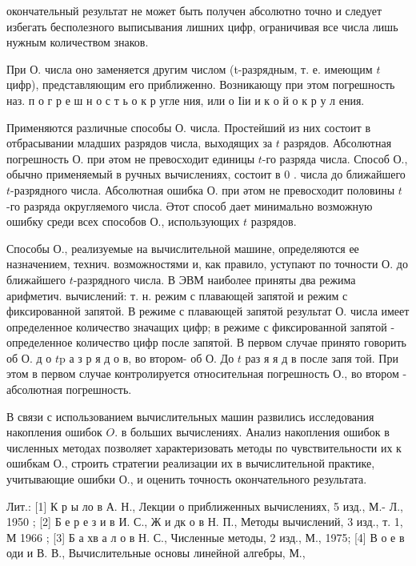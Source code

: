 \documentclass[10pt]{article}
\begin{document}
окончательный результат не может быть получен абсолютно точно и следует избегать бесполезного выписывания лишних цифр, ограничивая все числа лишь нужным количеством знаков.



При О. числа оно заменяется другим числом (t-разрядным, т. е. имеющим $t$ цифр), представляющим его приближенно. Возникающу при этом погрешность наз. п о г р е ш н о с т ь о к р угле ния, или о Ііи и к о й о к р у л ения.



Применяются различные способы О. числа. Простейший из них состоит в отбрасывании младших разрядов числа, выходящих за $t$ разрядов. Абсолютная погрешность О. при әтом не превосходит единицы $t$-го разряда числа. Способ О., обычно применяемый в ручных вычислениях, состоит в 0 . числа до ближайшего $t$-разрядного числа. Абсолютная ошибка О. при әтом не превосходит половины $t$-го разряда округляемого числа. Әтот способ дает минимально возможную ошибку среди всех способов О., использующих $t$ разрядов.



Способы О., реализуемые на вычислительной машине, определяются ее назначением, технич. возможностями и, как правило, уступают по точности О. до ближайшего $t$-разрядного числа. В ЭВМ наиболее приняты два режима арифметич. вычислений: т. н. режим с плавающей запятой и режим с фиксированной запятой. В режиме с плавающей запятой результат О. числа имеет определенное количество значащих цифр; в режиме с фиксированной запятой - определенное количество цифр после запятой. В первом случае принято говорить об О. д о $t \mathrm{p}$ а з р я д о в, во втором- об О. До $t$ раз я я д в после запя той. При этом в первом случае контролируется относительная погрешность О., во втором - абсолютная погрешность.



В связи с использованием вычислительных машин развились исследования накопления ошибок $O$. в больших вычислениях. Анализ накопления ошибок в численных методах позволяет характеризовать методы по чувствительности их к ошибкам О., строить стратегии реализации их в вычислительной практике, учитывающие ошибки О., и оценить точность окончательного результата.



Лит.: [1] К р ы ло в А. Н., Лекции о приближенных вычислениях, 5 изд., М.- Л., 1950 ; [2] Б е р е з и в И. С., Ж и дк о в Н. П., Методы вычислений, 3 изд., т. 1, М 1966 ; [3] Б а хв а л о в Н. С., Численные методы, 2 изд., М., 1975; [4] В о е в оди и В. В., Вычислительные основы линейной алгебры, М.,
\end{document}
